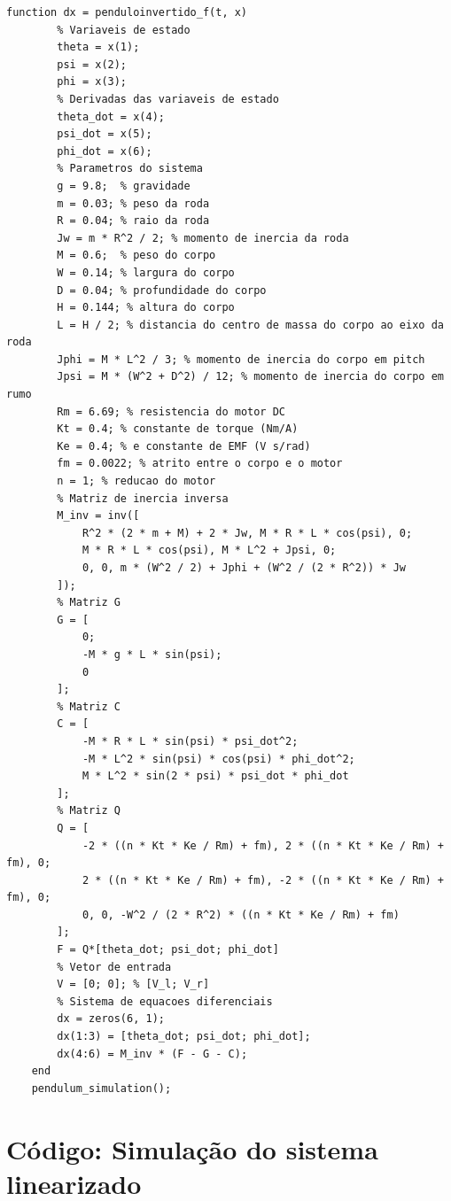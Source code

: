 \documentclass[10pt]{article}
\begin{document}
\begin{appendices}
\begin{lstlisting}[caption={Código da simulação do sistema não-linear com ode45}, label=lst:pendulum_sim]
    function dx = penduloinvertido_f(t, x)
        % Variaveis de estado
        theta = x(1);
        psi = x(2);
        phi = x(3);
        % Derivadas das variaveis de estado
        theta_dot = x(4);
        psi_dot = x(5);
        phi_dot = x(6);
        % Parametros do sistema
        g = 9.8;  % gravidade
        m = 0.03; % peso da roda
        R = 0.04; % raio da roda
        Jw = m * R^2 / 2; % momento de inercia da roda
        M = 0.6;  % peso do corpo
        W = 0.14; % largura do corpo
        D = 0.04; % profundidade do corpo
        H = 0.144; % altura do corpo
        L = H / 2; % distancia do centro de massa do corpo ao eixo da roda
        Jphi = M * L^2 / 3; % momento de inercia do corpo em pitch
        Jpsi = M * (W^2 + D^2) / 12; % momento de inercia do corpo em rumo
        Rm = 6.69; % resistencia do motor DC
        Kt = 0.4; % constante de torque (Nm/A)
        Ke = 0.4; % e constante de EMF (V s/rad)
        fm = 0.0022; % atrito entre o corpo e o motor
        n = 1; % reducao do motor
        % Matriz de inercia inversa
        M_inv = inv([
            R^2 * (2 * m + M) + 2 * Jw, M * R * L * cos(psi), 0;
            M * R * L * cos(psi), M * L^2 + Jpsi, 0;
            0, 0, m * (W^2 / 2) + Jphi + (W^2 / (2 * R^2)) * Jw
        ]);
        % Matriz G
        G = [
            0;
            -M * g * L * sin(psi);
            0
        ];
        % Matriz C
        C = [
            -M * R * L * sin(psi) * psi_dot^2;
            -M * L^2 * sin(psi) * cos(psi) * phi_dot^2;
            M * L^2 * sin(2 * psi) * psi_dot * phi_dot
        ];
        % Matriz Q
        Q = [
            -2 * ((n * Kt * Ke / Rm) + fm), 2 * ((n * Kt * Ke / Rm) + fm), 0;
            2 * ((n * Kt * Ke / Rm) + fm), -2 * ((n * Kt * Ke / Rm) + fm), 0;
            0, 0, -W^2 / (2 * R^2) * ((n * Kt * Ke / Rm) + fm)
        ];
        F = Q*[theta_dot; psi_dot; phi_dot]
        % Vetor de entrada
        V = [0; 0]; % [V_l; V_r]
        % Sistema de equacoes diferenciais
        dx = zeros(6, 1);
        dx(1:3) = [theta_dot; psi_dot; phi_dot];
        dx(4:6) = M_inv * (F - G - C);
    end
    pendulum_simulation();
\end{lstlisting}

\section{Código: Simulação do sistema linearizado}


\end{appendices}
\end{document}
